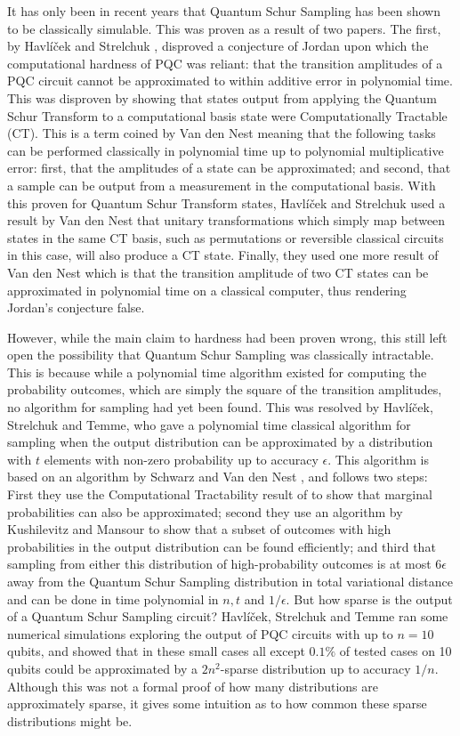 It has only been in recent years that Quantum Schur Sampling has been shown to be classically simulable. This was proven as a result of two papers. The first, by Havl\'{i}\v{c}ek and Strelchuk \cite{havlicek2018}, disproved a conjecture of Jordan upon which the computational hardness of PQC was reliant: that the transition amplitudes of a PQC circuit cannot be approximated to within additive error in polynomial time. This was disproven by showing that states output from applying the Quantum Schur Transform to a computational basis state were Computationally Tractable (CT). This is a term coined by Van den Nest \cite{vandennest2011} meaning that the following tasks can be performed classically in polynomial time up to polynomial multiplicative error: first, that the amplitudes of a state can be approximated; and second, that a sample can be output from a measurement in the computational basis. With this proven for Quantum Schur Transform states, Havl\'{i}\v{c}ek and Strelchuk used a result by Van den Nest that unitary transformations which simply map between states in the same CT basis, such as permutations or reversible classical circuits in this case, will also produce a CT state. Finally, they used one more result of Van den Nest which is that the transition amplitude of two CT states can be approximated in polynomial time on a classical computer, thus rendering Jordan's conjecture false.

However, while the main claim to hardness had been proven wrong, this still left open the possibility that Quantum Schur Sampling was classically intractable. This is because while a polynomial time algorithm existed for computing the probability outcomes, which are simply the square of the transition amplitudes, no algorithm for sampling had yet been found. This was resolved by Havl\'{i}\v{c}ek, Strelchuk and Temme, who gave a polynomial time classical algorithm for sampling when the output distribution can be approximated by a distribution with $t$ elements with non-zero probability up to accuracy $\epsilon$. This algorithm is based on an algorithm by Schwarz and Van den Nest \cite{schwarz2013}, and follows two steps: First they use the Computational Tractability result of \cite{havlicek2018} to show that marginal probabilities can also be approximated; second they use an algorithm by Kushilevitz and Mansour to show that a subset of outcomes with high probabilities in the output distribution can be found efficiently; and third that sampling from either this distribution of high-probability outcomes is at most $6\epsilon$ away from the Quantum Schur Sampling distribution in total variational distance and can be done in time polynomial in $n, t$ and $1/\epsilon$. But how sparse is the output of a Quantum Schur Sampling circuit? Havl\'{i}\v{c}ek, Strelchuk and Temme ran some numerical simulations exploring the output of PQC circuits with up to $n=10$ qubits, and showed that in these small cases all except $0.1\%$ of tested cases on 10 qubits could be approximated by a $2n^2$-sparse distribution up to accuracy $1/n$. Although this was not a formal proof of how many distributions are approximately sparse, it gives some intuition as to how common these sparse distributions might be.

